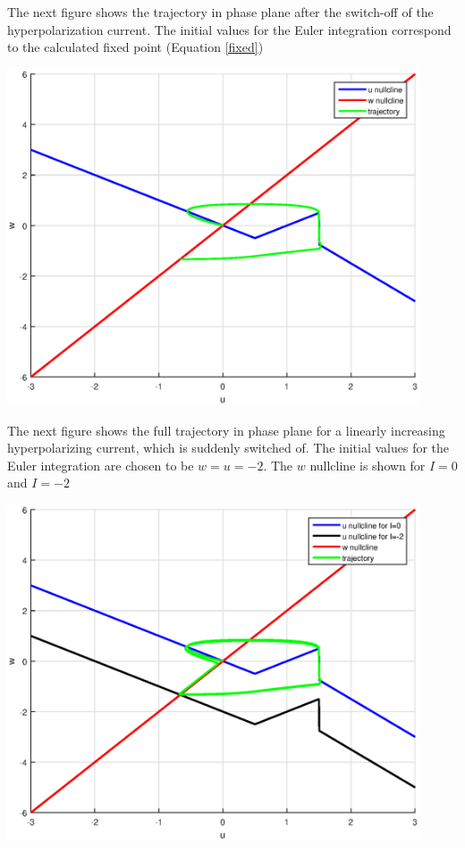 \documentclass[12pt]{article}
\newenvironment{exercise}[2][Exercise]{\begin{trivlist}
\item[\hskip \labelsep {\bfseries #1}\hskip \labelsep {\bfseries #2.}]}{\end{trivlist}}
\begin{document}
\begin{exercise}{3.2}
\begin{enumerate}
The next figure shows the trajectory in phase plane after the switch-off of the hyperpolarization current. The initial values for the Euler integration correspond to the calculated fixed point (Equation \ref{fixed})

\includegraphics[width=4.8in]{excercise32c_part}

The next figure shows the full trajectory in phase plane for a linearly increasing hyperpolarizing current, which is suddenly switched of. The initial values for the Euler integration are chosen to be $w=u=-2$. The $w$ nullcline is shown for $I=0$ and $I=-2$

\includegraphics[width=4.8in]{excercise32c_full}
\end{enumerate}

\end{exercise}
\end{document}
